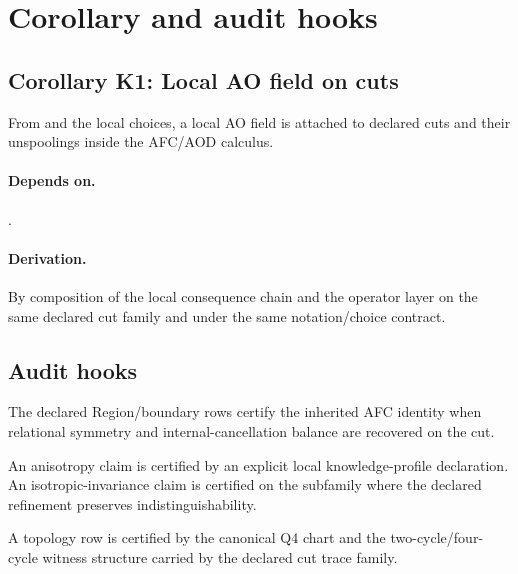 \section{Corollary and audit hooks}

\subsection{Corollary K1: Local AO field on cuts}
\begin{corollaryx}\label{cor:k1}
From  and the local choices, a local AO field is attached to declared cuts and their unspoolings inside the AFC/AOD calculus.
\end{corollaryx}
\paragraph{Depends on.} .
\paragraph{Derivation.} By composition of the local consequence chain and the operator layer on the same declared cut family and under the same notation/choice contract.

\subsection{Audit hooks}
\begin{hook}
\label{hook:h1}
The declared Region/boundary rows certify the inherited AFC identity when relational symmetry and internal-cancellation balance are recovered on the cut.
\end{hook}

\begin{hook}
\label{hook:h2}
An anisotropy claim is certified by an explicit local knowledge-profile declaration. An isotropic-invariance claim is certified on the subfamily where the declared refinement preserves indistinguishability.
\end{hook}

\begin{hook}
\label{hook:h3}
A topology row is certified by the canonical Q4 chart and the two-cycle/four-cycle witness structure carried by the declared cut trace family.
\end{hook}

